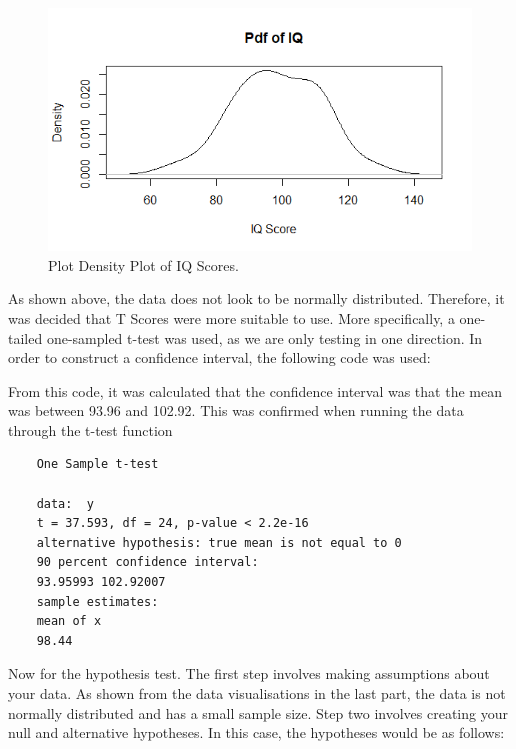 \documentclass[12pt,letterpaper]{article}
\begin{document}
\begin{figure}[h!]\centering
	\caption{\footnotesize Plot Density Plot of IQ Scores.}
	\label{fig:plot_1}
	\includegraphics[width=.75\textwidth]{pdfiq.png}
\end{figure}
\vspace{.25cm}

\noindent As shown above, the data does not look to be normally distributed. Therefore, it was decided that T Scores were more suitable to use. More specifically, a one-tailed one-sampled t-test was used, as we are only testing in one direction. In order to construct a confidence interval, the following code was used:\\

 
\vspace{.5cm}

\noindent From this code, it was calculated that the confidence interval was that the mean was between 93.96 and 102.92. This was confirmed when running the data through the t-test function\\
\vspace{.25cm}

\begin{verbatim}
	One Sample t-test
	
	data:  y
	t = 37.593, df = 24, p-value < 2.2e-16
	alternative hypothesis: true mean is not equal to 0
	90 percent confidence interval:
	93.95993 102.92007
	sample estimates:
	mean of x 
	98.44 
\end{verbatim}


\noindent Now for the hypothesis test. The first step involves making assumptions about your data. As shown from the data visualisations in the last part, the data is not normally distributed and has a small sample size. Step two involves creating your null and alternative hypotheses. In this case, the hypotheses would be as follows:\\
\end{document}
